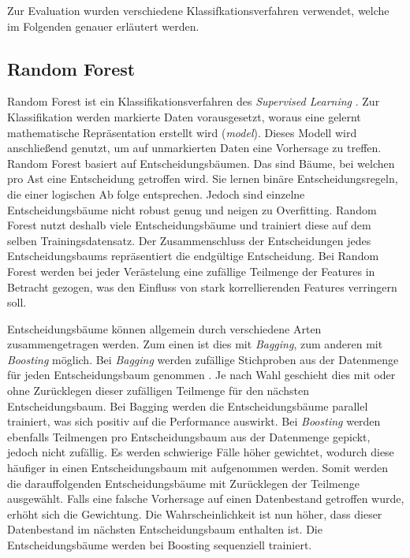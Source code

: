 Zur Evaluation wurden verschiedene Klassifkationsverfahren verwendet, welche im Folgenden genauer erläutert werden.

\subsection{Random Forest}
\label{ch:Basics:se:ml:ss:randomForest}

Random Forest ist ein Klassifikationsverfahren des \textit{Supervised Learning} \cite{WaybackMachine2016}. 
Zur Klassifikation werden markierte Daten vorausgesetzt, woraus eine gelernt mathematische Repräsentation erstellt wird (\textit{model}). 
Dieses Modell wird anschließend genutzt, um auf unmarkierten Daten eine Vorhersage zu treffen.
Random Forest basiert auf Entscheidungsbäumen. 
Das sind Bäume, bei welchen pro Ast eine Entscheidung getroffen wird.
Sie lernen binäre Entscheidungsregeln, die einer logischen Ab folge entsprechen.
Jedoch sind einzelne Entscheidungsbäume nicht robust genug und neigen zu Overfitting.
Random Forest nutzt deshalb viele Entscheidungsbäume und trainiert diese auf dem selben Trainingsdatensatz. 
Der Zusammenschluss der Entscheidungen jedes Entscheidungsbaums repräsentiert die endgültige Entscheidung.
Bei Random Forest werden bei jeder Verästelung eine zufällige Teilmenge der Features in Betracht gezogen, was den Einfluss von stark korrellierenden Features verringern soll.

Entscheidungsbäume können allgemein durch verschiedene Arten zusammengetragen werden. 
Zum einen ist dies mit \textit{Bagging}, zum anderen mit \textit{Boosting} möglich.
Bei \textit{Bagging} werden zufällige Stichproben aus der Datenmenge für jeden Entscheidungsbaum genommen \cite{jamesIntroductionStatisticalLearning2013}.
Je nach Wahl geschieht dies mit oder ohne Zurücklegen dieser zufälligen Teilmenge für den nächsten Entscheidungsbaum.
Bei Bagging werden die Entscheidungsbäume parallel trainiert, was sich positiv auf die Performance auswirkt.
Bei \textit{Boosting} werden ebenfalls Teilmengen pro Entscheidungsbaum aus der Datenmenge gepickt, jedoch nicht zufällig. 
Es werden schwierige Fälle höher gewichtet, wodurch diese häufiger in einen Entscheidungsbaum mit aufgenommen werden. 
Somit werden die darauffolgenden Entscheidungsbäume mit Zurücklegen der Teilmenge ausgewählt.
Falls eine falsche Vorhersage auf einen Datenbestand getroffen wurde, erhöht sich die Gewichtung.
Die Wahrscheinlichkeit ist nun höher, dass dieser Datenbestand im nächsten Entscheidungsbaum enthalten ist.
Die Entscheidungsbäume werden bei Boosting sequenziell trainiert.

